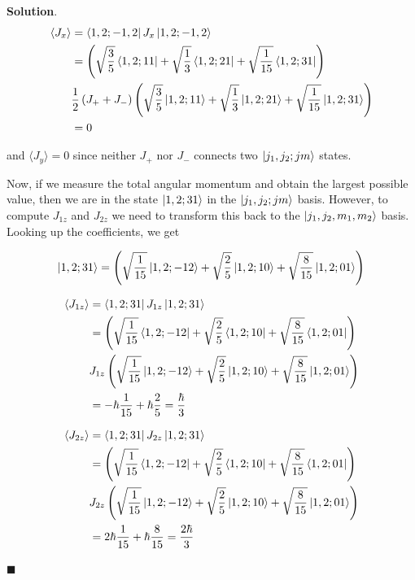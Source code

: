 \documentclass[12pt]{article}
\theoremstyle{definition}
\newenvironment{s}{%
        \begin{trivlist} \item \textbf{Solution}. }{%
            \hspace*{\fill} $\blacksquare$\end{trivlist}}%
\begin{document}
{\begin{s}
\begin{align*}
\langle J_x \rangle &= \bra{1,2;-1,2} J_x \ket{1,2;-1,2} \\
&= \left(\sqrt{\frac{3}{5}}\bra{1,2;1 1} + \sqrt{\frac{1}{3}}\bra{1,2;2 1} + \sqrt{\frac{1}{15}}\bra{1,2;3 1}\right)\\
&\frac{1}{2}\left(J_+ + J_-\right)\left(\sqrt{\frac{3}{5}}\ket{1,2;1 1} + \sqrt{\frac{1}{3}}\ket{1,2;2 1} + \sqrt{\frac{1}{15}}\ket{1,2;3 1}\right)\\
&= 0
\end{align*}

and $\langle J_{y} \rangle = 0$ since neither $J_+$ nor $J_-$ connects two $\ket{j_1,j_2;jm}$ states.

Now, if we measure the total angular momentum and obtain the largest possible value, then we are in the state $\ket{1,2;31}$ in the $\ket{j_1,j_2;jm}$ basis. However, to compute $J_{1z}$ and $J_{2z}$ we need to transform this back to the $\ket{j_1, j_2, m_1, m_2}$ basis. Looking up the coefficients, we get

\begin{align*}
\ket{1,2;31} = \left(\sqrt{\frac{1}{15}}\ket{1,2;-12} + \sqrt{\frac{2}{5}}\ket{1,2;10} + \sqrt{\frac{8}{15}}\ket{1,2;01}\right)
\end{align*}

\begin{align*}
\langle J_{1z} \rangle &= \bra{1,2;31} J_{1z}  \ket{1,2;31} \\
&= \left(\sqrt{\frac{1}{15}}\bra{1,2;-12} + \sqrt{\frac{2}{5}}\bra{1,2;10} + \sqrt{\frac{8}{15}}\bra{1,2;01}\right)\\
&J_{1z}\left(\sqrt{\frac{1}{15}}\ket{1,2;-12} + \sqrt{\frac{2}{5}}\ket{1,2;10} + \sqrt{\frac{8}{15}}\ket{1,2;01}\right)\\
&= -\hbar\frac{1}{15} + \hbar\frac{2}{5} =  \frac{\hbar}{3}
\end{align*}

\begin{align*}
\langle J_{2z} \rangle &= \bra{1,2;31} J_{2z}  \ket{1,2;31} \\
&= \left(\sqrt{\frac{1}{15}}\bra{1,2;-12} + \sqrt{\frac{2}{5}}\bra{1,2;10} + \sqrt{\frac{8}{15}}\bra{1,2;01}\right)\\
&J_{2z}\left(\sqrt{\frac{1}{15}}\ket{1,2;-12} + \sqrt{\frac{2}{5}}\ket{1,2;10} + \sqrt{\frac{8}{15}}\ket{1,2;01}\right)\\
&= 2\hbar\frac{1}{15} + \hbar\frac{8}{15} = \frac{2\hbar}{3}
\end{align*}


\end{s}}
\end{document}
